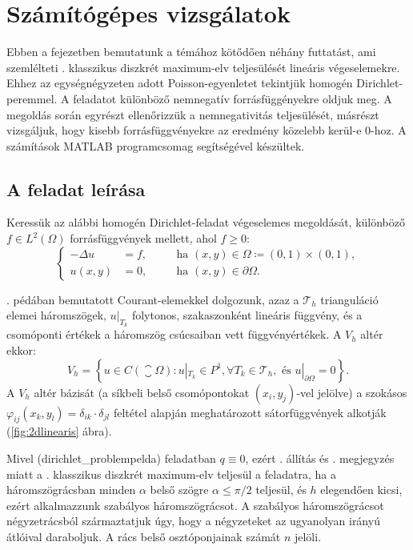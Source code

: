 \chapter{Számítógépes vizsgálatok}\label{ch:futtatas}

Ebben a fejezetben bemutatunk a témához kötődően néhány futtatást, ami szemlélteti . klasszikus diszkrét maximum-elv teljesülését lineáris végeselemekre. Ehhez az egységnégyzeten adott Poisson-egyenletet tekintjük homogén Dirichlet-peremmel. A feladatot különböző nemnegatív forrásfüggényekre oldjuk meg. A megoldás során egyrészt ellenőrizzük a nemnegativitás teljesülését, másrészt vizsgáljuk, hogy kisebb forrásfüggvényekre az eredmény közelebb kerül-e $0$-hoz. A számítások MATLAB programcsomag segítségével készültek.

\section{A feladat leírása}

Keressük az alábbi homogén Dirichlet-feladat végeselemes megoldását, különböző $f \in L^2(\Omega)$ forrásfüggvények mellett, ahol $f \geq 0$:
\begin{equation}\label{dirichlet_problempelda}		
	\left\{
	\begin{aligned}
		-\Delta u &= f,  &&\quad \text{ha } (x,y) \in \Omega \coloneqq (0,1)\times (0,1), \\
		u(x,y) &= 0, & &\quad \text{ha } (x,y) \in \partial\Omega.
	\end{aligned}
	\right.
\end{equation}

. pédában bemutatott Courant-elemekkel dolgozunk, azaz a $\mathcal{T}_h$ trianguláció elemei háromszögek,  $u|_{T_k}$ folytonos, szakaszonként lineáris függvény, és a csomóponti értékek a háromszög csúcsaiban vett függvényértékek. A $V_h$ altér ekkor:
\begin{equation*}
	V_h = \left\{ u \in C(\closure{\Omega}): u|_{T_k} \in P^1, \forall T_k \in \mathcal{T}_h, \text{ és } u|_{ \partial \Omega} = 0 \right\}.
\end{equation*}	
A $V_h$ altér bázisát (a síkbeli belső csomópontokat $(x_i,y_j)$-vel jelölve) a szokásos $\varphi_{ij}(x_k,y_l) = \delta_{ik} \cdot \delta_{jl}$ feltétel alapján meghatározott sátorfüggvények alkotják (\ref{fig:2dlinearis} ábra).

Mivel \aref({dirichlet_problempelda}) feladatban $q \equiv 0$, ezért . állítás és . megjegyzés miatt a . klasszikus diszkrét maximum-elv teljesül a feladatra, ha a háromszögrácsban minden $\alpha$ belső szögre $\alpha \leq \pi/2$ teljesül, és $h$ elegendően kicsi, ezért alkalmazzunk szabályos háromszögrácsot. A szabályos háromszögrácsot négyzetrácsból származtatjuk úgy, hogy a négyzeteket az ugyanolyan irányú átlóival daraboljuk. A rács belső osztóponjainak számát $n$ jelöli.

